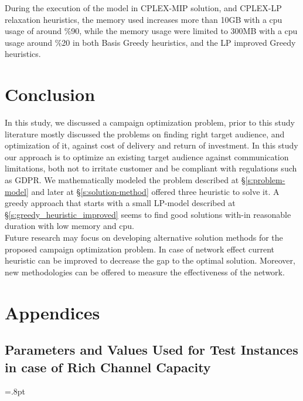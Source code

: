 \documentclass[11pt]{article}
\begin{document}
During the execution of the model in CPLEX-MIP solution, and CPLEX-LP relaxation heuristics, the memory used increases more than 10GB with a cpu usage of around \%90, while the memory usage were limited to 300MB with a cpu usage around \%20 in both Basis Greedy heuristics, and the LP improved Greedy heuristics.\\


\section{Conclusion} \label{s:conclusion}
In this study, we discussed a campaign optimization problem, prior to this study literature mostly discussed the problems on finding right target audience, and optimization of it, against cost of delivery and return of investment. In this study our approach is to optimize an existing target audience against communication limitations, both not to irritate customer and be compliant with regulations such as GDPR. We mathematically modeled the problem described at \S \ref{s:problem-model} and later at \S \ref{s:solution-method} offered three heuristic to solve it. A greedy approach that starts with a small LP-model described at \S \ref{s:greedy_heuristic_improved} seems to find good solutions with-in reasonable duration with low memory and cpu.\\
Future research may focus on developing alternative solution methods for the proposed campaign optimization problem. In case of network effect current heuristic can be improved to decrease the gap to the optimal solution. Moreover, new methodologies can be offered to measure the effectiveness of the network.
\newpage

\newpage

\appendix

\section{Appendices}

\subsection{Parameters and Values Used for Test Instances in case of Rich Channel Capacity}\label{s:apendix-parameters-in-test-instances}

\arraycolsep=.8pt\def\arraystretch{.8}
\tiny  %
\setlength\LTleft{-30pt}            %
\setlength\LTright{-30pt}           %
\end{document}

